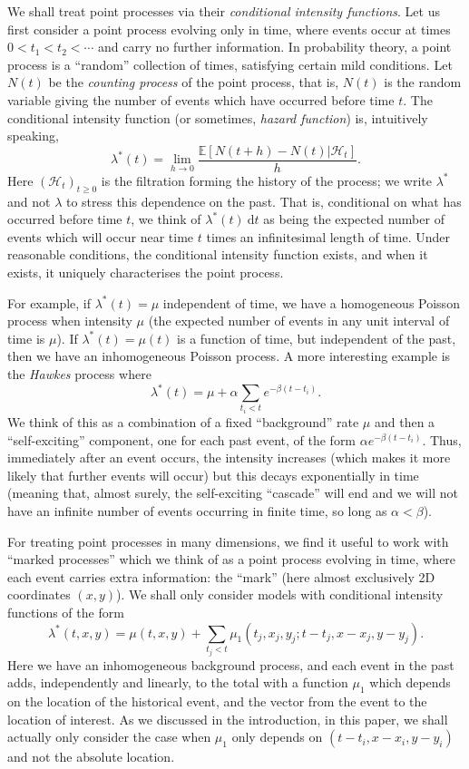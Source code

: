\documentclass[twoside,a4paper]{article}
\theoremstyle{plain}
\theoremstyle{definition}
\newcommand{\mc}{\mathcal}
\newcommand{\rd}{\textrm{d}}
\begin{document}
We shall treat point processes via their \emph{conditional intensity functions}.
Let us first consider a point process evolving only in time, where events occur at times
$0 < t_1 < t_2 < \cdots $ and carry no further information.  In probability theory, a point
process is a ``random'' collection of times, satisfying certain mild conditions.  Let $N(t)$
be the \emph{counting process} of the point process, that is, $N(t)$ is the random variable
giving the number of events which have occurred before time $t$.  The conditional intensity 
function (or sometimes, \emph{hazard function}) is, intuitively speaking,
\[ \lambda^*(t) = \lim_{h\rightarrow 0} \frac{\mathbb E[ N(t+h) - N(t) | \mc H_t ]}{h}. \]
Here $(\mc H_t)_{t\geq 0}$ is the filtration forming the history of the process; we write 
$\lambda^*$ and not $\lambda$ to stress this dependence on the past.
That is, conditional on what has occurred before time $t$, we think of
$\lambda^*(t) \ \rd t$ as being the expected number of events which will occur near time
$t$ times an infinitesimal length of time.  Under reasonable conditions, the conditional 
intensity function exists, and when it exists, it uniquely characterises the point process.

For example, if $\lambda^*(t) = \mu$ independent of time, we have a homogeneous Poisson
process when intensity $\mu$ (the expected number of events in any unit interval of time is
$\mu$).  If $\lambda^*(t) = \mu(t)$ is a function of time, but independent of the past, 
then we have an inhomogeneous Poisson process.  A more interesting example is the \emph{Hawkes}
process where
\[ \lambda^*(t) = \mu + \alpha \sum_{t_i < t} e^{-\beta(t-t_i)}. \]
We think of this as a combination of a fixed ``background'' rate $\mu$ and then a 
``self-exciting'' component, one for each past event, of the form $\alpha e^{-\beta(t-t_i)}$.
Thus, immediately after an event occurs, the intensity increases (which makes it more likely
that further events will occur) but this decays exponentially in time (meaning that, almost
surely, the self-exciting ``cascade'' will end and we will not have an infinite number of
events occurring in finite time, so long as $\alpha < \beta$).

For treating point processes in many dimensions, we find it useful to work with ``marked
processes'' which we think of as a point process evolving in time, where each event carries
extra information: the ``mark'' (here almost exclusively 2D coordinates $(x,y)$).  
We shall only consider models with conditional intensity functions of the form
\begin{equation}
\lambda^*(t,x,y) = \mu(t,x,y) + \sum_{t_j<t} \mu_1(t_j,x_j,y_j;t-t_j,x-x_j,y-y_j).
\label{eq:main}
\end{equation}
Here we have an inhomogeneous background process, and each event in the past adds,
independently and linearly, to the total with a function $\mu_1$ which depends on the
location of the historical event, and the vector from the event to the location of interest.
As we discussed in the introduction, in this paper, we shall actually only consider
the case when $\mu_1$ only depends on $(t-t_i,x-x_i,y-y_i)$ and not the absolute location.
\end{document}
